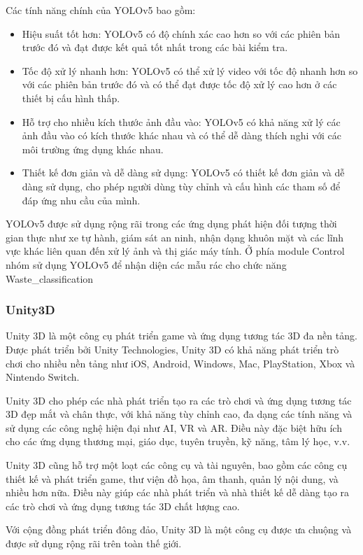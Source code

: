 Các tính năng chính của YOLOv5 bao gồm:
\begin{itemize}
    \item Hiệu suất tốt hơn: YOLOv5 có độ chính xác cao hơn so với các phiên bản trước đó và đạt được kết quả tốt nhất trong các bài kiểm tra.
    \item Tốc độ xử lý nhanh hơn: YOLOv5 có thể xử lý video với tốc độ nhanh hơn so với các phiên bản trước đó và có thể đạt được tốc độ xử lý cao hơn ở các thiết bị cấu hình thấp.
    \item Hỗ trợ cho nhiều kích thước ảnh đầu vào: YOLOv5 có khả năng xử lý các ảnh đầu vào có kích thước khác nhau và có thể dễ dàng thích nghi với các môi trường ứng dụng khác nhau.
    \item Thiết kế đơn giản và dễ dàng sử dụng: YOLOv5 có thiết kế đơn giản và dễ dàng sử dụng, cho phép người dùng tùy chỉnh và cấu hình các tham số để đáp ứng nhu cầu của mình.
\end{itemize}
YOLOv5 được sử dụng rộng rãi trong các ứng dụng phát hiện đối tượng thời gian thực như xe tự hành, giám sát an ninh, nhận dạng khuôn mặt và các lĩnh vực khác liên quan đến xử lý ảnh và thị giác máy tính. Ở phía module Control nhóm sử dụng YOLOv5 để nhận diện các mẫu rác cho chức năng Waste\_classification

\subsubsection{Unity3D}
Unity 3D là một công cụ phát triển game và ứng dụng tương tác 3D đa nền tảng. Được phát triển bởi Unity Technologies, Unity 3D có khả năng phát triển trò chơi cho nhiều nền tảng như iOS, Android, Windows, Mac, PlayStation, Xbox và Nintendo Switch.

Unity 3D cho phép các nhà phát triển tạo ra các trò chơi và ứng dụng tương tác 3D đẹp mắt và chân thực, với khả năng tùy chỉnh cao, đa dạng các tính năng và sử dụng các công nghệ hiện đại như AI, VR và AR. Điều này đặc biệt hữu ích cho các ứng dụng thương mại, giáo dục, tuyên truyền, kỹ năng, tâm lý học, v.v.

Unity 3D cũng hỗ trợ một loạt các công cụ và tài nguyên, bao gồm các công cụ thiết kế và phát triển game, thư viện đồ họa, âm thanh, quản lý nội dung, và nhiều hơn nữa. Điều này giúp các nhà phát triển và nhà thiết kế dễ dàng tạo ra các trò chơi và ứng dụng tương tác 3D chất lượng cao.

Với cộng đồng phát triển đông đảo, Unity 3D là một công cụ được ưa chuộng và được sử dụng rộng rãi trên toàn thế giới.

